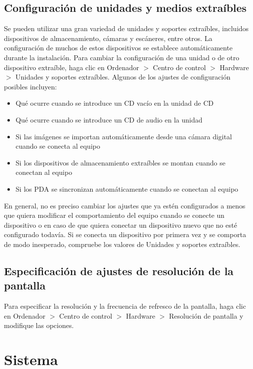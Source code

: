 \subsection{Configuración de unidades y medios extraíbles}
Se pueden utilizar una gran variedad de unidades y soportes extraíbles, incluidos dispositivos de almacenamiento, cámaras y escáneres, entre otros. La configuración de muchos de estos dispositivos se establece automáticamente durante la instalación. Para cambiar la configuración de una unidad o de otro dispositivo extraíble, haga clic en Ordenador $>$ Centro de control $>$ Hardware $>$ Unidades y soportes extraíbles.
Algunos de los ajustes de configuración posibles incluyen:
\begin{itemize}
\item Qué ocurre cuando se introduce un CD vacío en la unidad de CD
\item Qué ocurre cuando se introduce un CD de audio en la unidad
\item Si las imágenes se importan automáticamente desde una cámara digital cuando se conecta al equipo
\item Si los dispositivos de almacenamiento extraíbles se montan cuando se conectan al equipo
\item Si los PDA se sincronizan automáticamente cuando se conectan al equipo
\end{itemize}
En general, no es preciso cambiar los ajustes que ya estén configurados a menos que quiera modificar el comportamiento del equipo cuando se conecte un dispositivo o en caso de que quiera conectar un dispositivo nuevo que no esté configurado todavía. Si se conecta un dispositivo por primera vez y se comporta de modo inesperado, compruebe los valores de Unidades y soportes extraíbles.
\subsection{Especificación de ajustes de resolución de la pantalla}
Para especificar la resolución y la frecuencia de refresco de la pantalla, haga clic en Ordenador $>$ Centro de control $>$ Hardware $>$ Resolución de pantalla y modifique las
opciones.
\section{Sistema}

